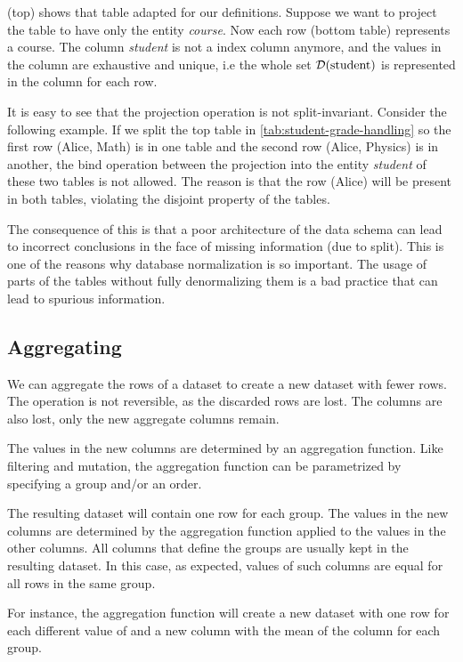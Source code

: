  (top) shows that table adapted for our definitions.
Suppose we want to project the table to have only the entity \emph{course}.
Now each row (bottom table) represents a course.  The column \emph{student} is not a
index column anymore, and the values in the column are exhaustive and unique, i.e
the whole set $\mathcal{D}\!\left(\text{student}\right)$ is represented in the column for each row.

It is easy to see that the projection operation is not split-invariant.  Consider the
following example. If we split the top table in \cref{tab:student-grade-handling} so the
first row (Alice, Math) is in one table and the second row (Alice, Physics) is in another,
the bind operation between the projection into the entity \emph{student} of these two
tables is not allowed.  The reason is that the row (Alice) will be present in both tables,
violating the disjoint property of the tables.

The consequence of this is that a poor architecture of the data schema can lead to
incorrect conclusions in the face of missing information (due to split).  This is one of
the reasons why database normalization is so important.  The usage of parts of the tables
without fully denormalizing them is a bad practice that can lead to spurious information.

\subsection{Aggregating}
\label{sub:aggregation}

We can aggregate the rows of a dataset to create a new dataset with fewer rows.    The
operation is not reversible, as the discarded rows are lost.  The columns are also lost,
only the new aggregate columns remain.

The values in the new columns are determined by an aggregation function.  Like filtering
and mutation, the aggregation function can be parametrized by specifying a group and/or an
order.

The resulting dataset will contain one row for each group.  The values in the new columns
are determined by the aggregation function applied to the values in the other columns.
All columns that define the groups are usually kept in the resulting dataset.  In this
case, as expected, values of such columns are equal for all rows in the same group.

For instance, the aggregation function  will create a
new dataset with one row for each different value of  and a new column
with the mean of the  column for each group.

